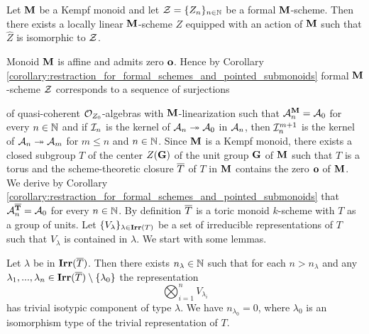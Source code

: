 \begin{theorem}\label{theorem:every_formal_over_kempf_monoid_is_formal_neighborhood}
Let $\mathbf{M}$ be a Kempf monoid and let ${\mathcal Z} = \{Z_n\}_{n\in {\mathbb N}}$ be a formal $\mathbf{M}$-scheme. Then there exists a locally linear $\mathbf{M}$-scheme $Z$ equipped with an action of $\mathbf{M}$ such that $\widehat{Z}$ is isomorphic to ${\mathcal Z}$.
\end{theorem}
\noindent
Monoid $\mathbf{M}$ is affine and admits zero $\mathbf{o}$. Hence by Corollary \ref{corollary:restraction_for_formal_schemes_and_pointed_submonoids} formal $\mathbf{M}$-scheme ${\mathcal Z}$ corresponds to a sequence of surjections
\begin{center}
\end{center}
of quasi-coherent ${\mathcal O}_{Z_0}$-algebras with $\mathbf{M}$-linearization such that ${\mathcal A}_n^{\mathbf{M}} = {\mathcal A}_0$ for every $n\in {\mathbb N}$ and if ${\mathcal I}_n$ is the kernel of ${\mathcal A}_n\twoheadrightarrow {\mathcal A}_0$ in ${\mathcal A}_n$, then ${\mathcal I}_n^{m+1}$ is the kernel of ${\mathcal A}_n\twoheadrightarrow {\mathcal A}_m$ for $m\leq n$ and $n\in {\mathbb N}$. Since $\mathbf{M}$ is a Kempf monoid, there exists a closed subgroup $T$ of the center $Z(\mathbf{G})$ of the unit group $\mathbf{G}$ of $\mathbf{M}$ such that $T$ is a torus and the scheme-theoretic closure $\overline{T}$ of $T$ in $\mathbf{M}$ contains the zero $\mathbf{o}$ of $\mathbf{M}$. We derive by Corollary \ref{corollary:restraction_for_formal_schemes_and_pointed_submonoids} that ${\mathcal A}_n^{\mathbf{\overline{T}}} = {\mathcal A}_0$ for every $n\in {\mathbb N}$. By definition $\overline{T}$ is a toric monoid $k$-scheme with $T$ as a group of units. Let $\{V_{\lambda}\}_{\lambda\in \mathbf{Irr}(T)}$ be a set of irreducible representations of $T$ such that $V_{\lambda}$ is contained in $\lambda$.
We start with some lemmas.

\begin{lemma}\label{lemma:stablization_for_representations}
Let $\lambda$ be in $\mathbf{Irr}(\overline{T})$. Then there exists $n_{\lambda}\in {\mathbb N}$ such that for each $n > n_{\lambda}$ and any $\lambda_1,...,\lambda_n\in \mathbf{Irr}(\overline{T})\setminus \{\lambda_0\}$ the representation
$$\bigotimes_{i=1}^nV_{\lambda_i}$$ 
has trivial isotypic component of type $\lambda$. We have $n_{\lambda_0} = 0$, where $\lambda_0$ is an isomorphism type of the trivial representation of $T$.
\end{lemma}

